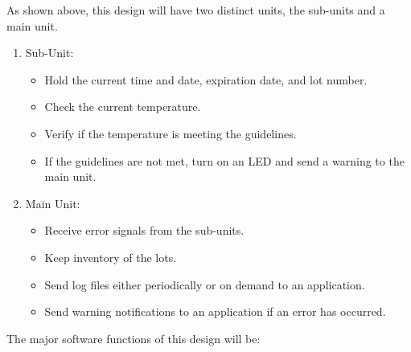As shown above, this design will have two distinct units, the sub-units and a main unit.\\
\begin{enumerate}
  \item Sub-Unit:
        \begin{itemize}
          \item Hold the current time and date, expiration date, and lot number.
          \item Check the current temperature.
          \item Verify if the temperature is meeting the guidelines.
          \item If the guidelines are not met, turn on an LED and send a warning to the main unit.
        \end{itemize}
  \item Main Unit:
        \begin{itemize}
          \item Receive error signals from the sub-units.
          \item Keep inventory of the lots.
          \item Send log files either periodically or on demand to an application.
                \item Send warning notifications to an application if an error has occurred.
        \end{itemize}
\end{enumerate}
The major software functions of this design will be:
\begin{enumerate}
\end{enumerate}
